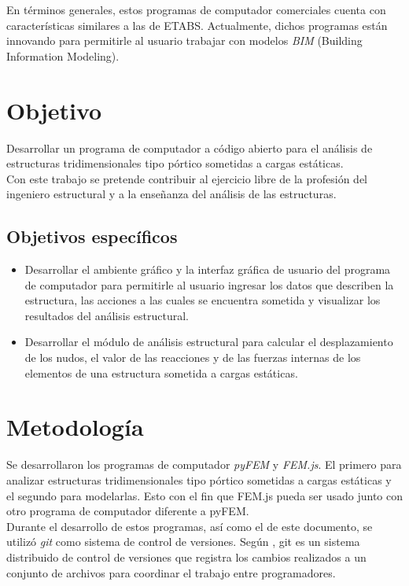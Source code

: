 En términos generales, estos programas de computador comerciales cuenta con características similares a las de ETABS. Actualmente, dichos programas están innovando para permitirle al usuario trabajar con modelos \emph{BIM} (Building Information Modeling).\\

\section{Objetivo}

Desarrollar un programa de computador a código abierto para el análisis de estructuras tridimensionales tipo pórtico sometidas a cargas estáticas.\\

Con este trabajo se pretende contribuir al ejercicio libre de la profesión del ingeniero estructural y a la enseñanza del análisis de las estructuras.

\subsection{Objetivos específicos}

\begin{itemize}
\item Desarrollar el ambiente gráfico y la interfaz gráfica de usuario del programa de computador para permitirle al usuario ingresar los datos que describen la estructura, las acciones a las cuales se encuentra sometida y visualizar los resultados del análisis estructural.
\item Desarrollar el módulo de análisis estructural para calcular el desplazamiento de los nudos, el valor de las reacciones y de las fuerzas internas de los elementos de una estructura sometida a cargas estáticas.
\end{itemize}

\section{Metodología}

Se desarrollaron los programas de computador \emph{pyFEM} y \emph{FEM.js}. El primero para analizar estructuras tridimensionales tipo pórtico sometidas a cargas estáticas y el segundo para modelarlas. Esto con el fin que FEM.js pueda ser usado junto con otro programa de computador diferente a pyFEM.\\

Durante el desarrollo de estos programas, así como el de este documento, se utilizó \emph{git} como sistema de control de versiones. Según \cite{chacon2014git}, git es un sistema distribuido de control de versiones que registra los cambios realizados a un conjunto de archivos para coordinar el trabajo entre programadores.\\

